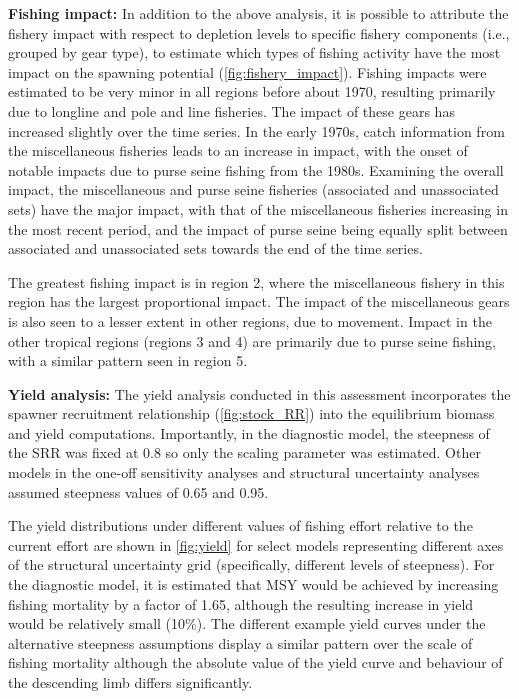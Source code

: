 \textbf{Fishing impact:} In addition to the above analysis, it is possible to attribute the fishery impact with respect to depletion levels to specific fishery components (i.e., grouped by gear type), to estimate which types of fishing activity have the most impact on the spawning potential (\autoref{fig:fishery_impact}). Fishing impacts were estimated to be very minor in all regions before about 1970, resulting primarily due to longline and pole and line fisheries. The impact of these gears has increased slightly over the time series. In the early 1970s, catch information from the miscellaneous fisheries leads to an increase in impact, with the onset of notable impacts due to purse seine fishing from the 1980s. Examining the overall impact, the miscellaneous and purse seine fisheries (associated and unassociated sets) have the major impact, with that of the miscellaneous fisheries increasing in the most recent period, and the impact of purse seine being equally split between associated and unassociated sets towards the end of the time series.

The greatest fishing impact is in region 2, where the miscellaneous fishery in this region has the largest proportional impact. The impact of the miscellaneous gears is also seen to a lesser extent in other regions, due to movement. Impact in the other tropical regions (regions 3 and 4) are primarily due to purse seine fishing, with a similar pattern seen in region 5.

\textbf{Yield analysis:} The yield analysis conducted in this assessment incorporates the spawner recruitment relationship (\autoref{fig:stock_RR}) into the equilibrium biomass and yield computations. Importantly, in the diagnostic model, the steepness of the SRR was fixed at 0.8 so only the scaling parameter was estimated. Other models in the one-off sensitivity analyses and structural uncertainty analyses assumed steepness values of 0.65 and 0.95.

The yield distributions under different values of fishing effort relative to the current effort are shown in \autoref{fig:yield} for select models representing different axes of the structural uncertainty grid (specifically, different levels of steepness). For the diagnostic model, it is estimated that MSY would be achieved by increasing fishing mortality by a factor of 1.65, although the resulting increase in yield would be relatively small (10\%). The different example yield curves under the alternative steepness assumptions display a similar pattern over the scale of fishing mortality although the absolute value of the yield curve and behaviour of the descending limb differs significantly.

